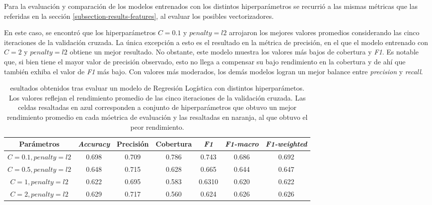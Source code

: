 Para la evaluación y comparación de los modelos entrenados con los
distintos hiperparámetros se recurrió a las mismas métricas que las
referidas en la sección \ref{subsection-results-features}, al evaluar
los posibles vectorizadores.
\par
En este caso, se encontró que los hiperparámetros $C=0.1$ y $penalty=l2$
arrojaron los mejores valores promedios considerando las cinco iteraciones
de la validación cruzada. La única excepción a esto es el resultado en la
métrica de precisión, en el que el modelo entrenado con $C=2$ y $penalty=l2$
obtiene un mejor resultado. No obstante, este modelo muestra los valores
más bajos de cobertura y \textit{F1}. Es notable que, si bien tiene el mayor
valor de precisión observado, esto no llega a compensar su bajo rendimiento
en la cobertura y de ahí que también exhiba el valor de \textit{F1} más bajo.
Con valores más moderados, los demás modelos logran un mejor balance entre
\textit{precision} y \textit{recall}.

\begin{table}[h!]
    \centering
    \begin{adjustbox}{max width=\textwidth}
    \begin{tabular}{ *{7}{|c}| }
    \hline
    Parámetros & \textit{Accuracy} & Precisión & Cobertura & \textit{F1} & \textit{F1-macro} & \textit{F1-weighted} \\
    \hline\hline
    $C=0.1, penalty=l2$ & 0.698 & 0.709 & 0.786  & 0.743 & 0.686 & 0.692 \\
    \hline
    $C=0.5, penalty=l2$ & 0.648 & 0.715 & 0.628  & 0.665 & 0.644 & 0.647 \\
    \hline
    $C=1, penalty=l2$ & 0.622 & 0.695 & 0.583 & 0.6310 & 0.620 & 0.622 \\
    \hline
    $C=2, penalty=l2$ & 0.629 & 0.717 & 0.560 & 0.624 & 0.626 & 0.626 \\
    \hline
\end{tabular}
\end{adjustbox}
\caption{esultados obtenidos tras evaluar un modelo de Regresión Logística con
distintos hiperparámetos. Los valores reflejan el rendimiento promedio de las
cinco iteraciones de la validación cruzada. Las celdas resaltadas en azul
corresponden a conjunto de hiperparámetros que obtuvo un mejor rendimiento
promedio en cada móetrica de evaluación y las resaltadas en naranja, al
que obtuvo el peor rendimiento.}
\end{table}

